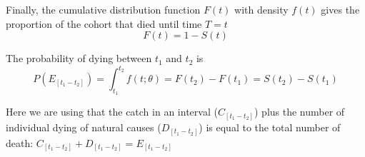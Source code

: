 Finally, the cumulative distribution function $F(t)$ with density $f(t)$ gives the proportion of the cohort that died until time $T=t$
\begin{equation}
F(t) = 1 - S(t)
\end{equation}

The probability of dying between $t_{1}$ and $t_{2}$ is
\begin{equation}
P(E_{[t_{1}-t_{2}]}) = \int_{t_{1}}^{t_{2}} f(t; \theta) = F(t_{2}) - F(t_{1}) = S(t_{2}) - S(t_{1})
\end{equation}

Here we are using that the catch in an interval ($C_{[t_{1}-t_{2}]}$) plus the number of individual dying of natural causes ($D_{[t_{1}-t_{2}]}$) is equal to the total number of death: $C_{[t_{1}-t_{2}]} + D_{[t_{1}-t_{2}]} = E_{[t_{1}-t_{2}]}$








